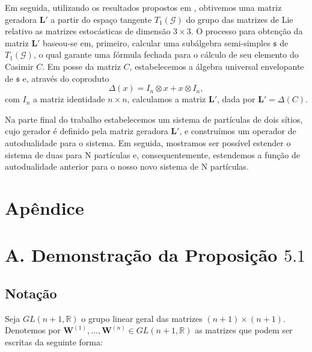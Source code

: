 \documentclass[twoside,openright,titlepage,numbers=noenddot,headinclude,  lineheaders footinclude=true,cleardoublepage=empty,
                                BCOR=5mm,paper=a4,fontsize=12pt ]{scrbook}
\theoremstyle{definition}
\begin{document}
Em seguida, utilizando os resultados propostos em \cite{paper2}, obtivemos uma matriz
geradora $\bm{L}'$ a partir do espaço tangente $T_1(\mathcal{G})$ do grupo das matrizes de Lie relativo
as matrizes estocásticas de dimensão $3 \times 3$. O processo para obtenção da matriz $\bm{L}'$ baseou-se
em, primeiro, calcular uma subálgebra semi-simples $\mathfrak{s}$ de $T_1(\mathcal{G})$, o qual garante uma fórmula
fechada para o cálculo de seu elemento do Casimir $C$. Em posse da matriz $C$, estabelecemos a 
álgebra universal envelopante de $\mathfrak{s}$ e, através do coproduto
\[ \Delta(x) = I_n \otimes x + x \otimes I_n, \]
com $I_n$ a matriz identidade $n \times n$,
calculamos a matriz $\bm{L}'$, dada por $\bm{L}' = \Delta(C)$.

Na parte final do trabalho estabelecemos um sistema de partículas de dois sítios, cujo gerador é
definido   pela matriz geradora $\bm{L}'$,
e construímos um operador de autodualidade para o sistema. Em seguida, mostramos ser possível
estender o sistema de duas para N partículas e, consequentemente, estendemos a função de autodualidade anterior
para o nosso novo sistema de N partículas.

\backmatter
\appendix
\chapter{Ap\^endice}

\chapter{A. Demonstra\c{c}\~ao da Proposi\c{c}\~ao $5.1$  } \label{myproof}

\section{Nota\c{c}\~ao}

Seja $GL(n+1,\mathbb{R})$ o grupo linear geral das matrizes
$(n+1) \times (n+1)$.
Denotemos por $\mathbf{W}^{(1)}, \ldots, \mathbf{W}^{(n)}
\in GL(n+1,\mathbb{R})$  as matrizes que podem ser escritas 
da seguinte forma:
\end{document}
